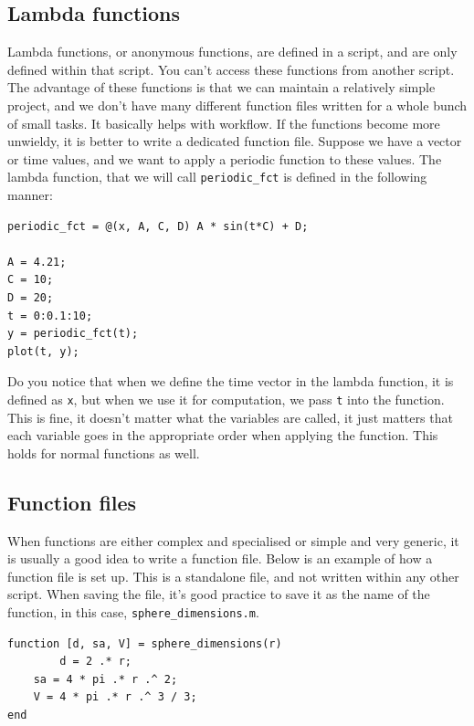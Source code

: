\documentclass[12pt]{article}
\begin{document}
\subsection{Lambda functions}
Lambda functions, or anonymous functions, are defined in a script, and are only defined within that script. You can't access these functions from another script. The advantage of these functions is that we can maintain a relatively simple project, and we don't have many different function files written for a whole bunch of small tasks. It basically helps with workflow. If the functions become more unwieldy, it is better to write a dedicated function file. Suppose we have a vector or time values, and we want to apply a periodic function to these values. The lambda function, that we will call \texttt{periodic\_fct} is defined in the following manner:
\begin{lstlisting}
periodic_fct = @(x, A, C, D) A * sin(t*C) + D;

A = 4.21;
C = 10;
D = 20;
t = 0:0.1:10;
y = periodic_fct(t);
plot(t, y);
\end{lstlisting}
Do you notice that when we define the time vector in the lambda function, it is defined as \texttt{x}, but when we use it for computation, we pass \texttt{t} into the function. This is fine, it doesn't matter what the variables are called, it just matters that each variable goes in the appropriate order when applying the function. This holds for normal functions as well.

\subsection{Function files}
When functions are either complex and specialised or simple and very generic, it is usually a good idea to write a function file. Below is an example of how a function file is set up. This is a standalone file, and not written within any other script. When saving the file, it's good practice to save it as the name of the function, in this case, \texttt{sphere\_dimensions.m}.
\begin{lstlisting}
function [d, sa, V] = sphere_dimensions(r)
		d = 2 .* r;
    sa = 4 * pi .* r .^ 2;
    V = 4 * pi .* r .^ 3 / 3;
end
\end{lstlisting}
\end{document}
